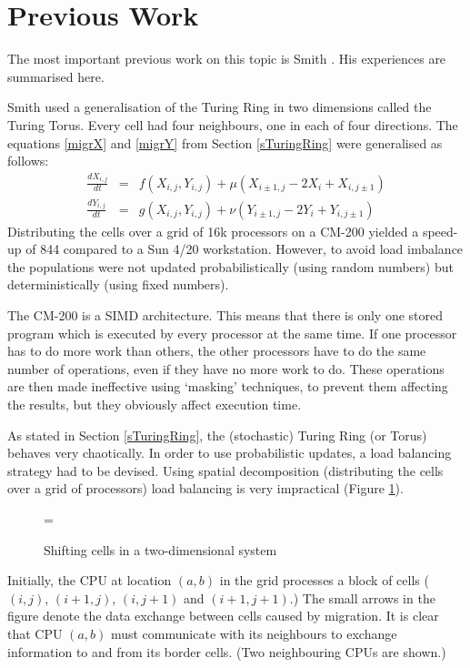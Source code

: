 \section{Previous Work}
\label{sPrevWork}

The most important previous work on this topic is Smith
\cite{Smith92}. His experiences are summarised here.

Smith used a generalisation of the Turing Ring in two dimensions
called the Turing Torus. 
Every cell had four neighbours, one in each of four directions. The
equations \ref{migrX} and \ref{migrY} 
from Section \ref{sTuringRing} were generalised
as follows:
\begin{eqnarray}
        \frac{dX_{i,j}}{dt} & = & f(X_{i, j}, Y_{i, j}) +
	\mu(X_{i \pm 1, j} - 2X_i + X_{i, j \pm 1}) \\
        \frac{dY_{i,j}}{dt} & = & g(X_{i, j}, Y_{i, j}) +
	\nu(Y_{i \pm 1, j} - 2Y_i + Y_{i, j \pm 1} )
\end{eqnarray}
Distributing the cells over a grid of 16k processors on a CM-200 
yielded a speed-up of 844 compared to a Sun 4/20
workstation. However, to avoid load imbalance the populations were not
updated probabilistically (using random numbers) but deterministically
(using fixed numbers).

The CM-200 is a SIMD architecture. This means that there is only one
stored program which is executed by every processor at the same time.
If one processor has to do more work than others, the other processors
have to do the same number of operations, even if they have no more
work to do. These operations are then made ineffective using `masking'
techniques, to prevent them affecting the results, but they obviously
affect execution time.

As stated in Section \ref{sTuringRing}, the (stochastic) Turing Ring (or
Torus) behaves
very chaotically. In order to use probabilistic updates, a load
balancing strategy had to be devised. Using spatial decomposition
(distributing the cells over a grid of processors) load
balancing is very impractical (Figure \ref{fShift2Dim}).

\begin{figure}
\epsfxsize=\textwidth
{}
\caption{Shifting cells in a two-dimensional system}
\label{fShift2Dim}
\end{figure}

Initially, the CPU at location $(a,b)$ in the grid processes a block of
cells ($(i, j)$, $(i+1, j)$, $(i, j+1)$ and $(i+1, j+1)$.) The
small arrows in the figure denote the data exchange between cells
caused by migration. It is clear that CPU $(a,b)$ must communicate with
its neighbours to exchange information to and from its border cells.
(Two neighbouring CPUs are shown.)

